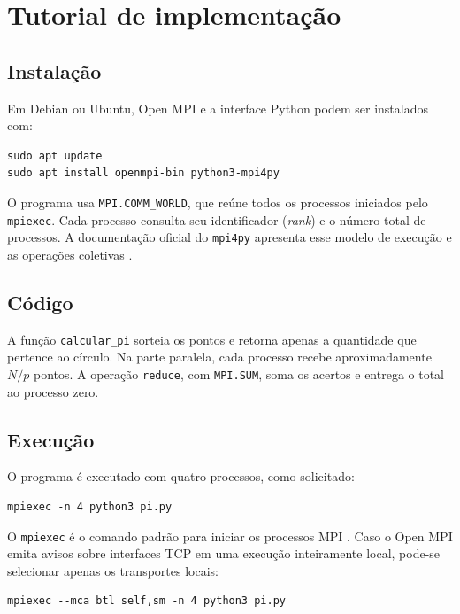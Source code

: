 \section{Tutorial de implementação}

\subsection{Instalação}

Em Debian ou Ubuntu, Open MPI e a interface Python podem ser instalados com:

\begin{lstlisting}[style=terminal]
sudo apt update
sudo apt install openmpi-bin python3-mpi4py
\end{lstlisting}

O programa usa \texttt{MPI.COMM\_WORLD}, que reúne todos os processos
iniciados pelo \texttt{mpiexec}. Cada processo consulta seu identificador
(\textit{rank}) e o número total de processos. A documentação oficial do
\texttt{mpi4py} apresenta esse modelo de execução e as operações coletivas
\cite{mpi4py}.

\subsection{Código}

A função \texttt{calcular\_pi} sorteia os pontos e retorna apenas a quantidade
que pertence ao círculo. Na parte paralela, cada processo recebe
aproximadamente $N/p$ pontos. A operação \texttt{reduce}, com
\texttt{MPI.SUM}, soma os acertos e entrega o total ao processo zero.



\subsection{Execução}

O programa é executado com quatro processos, como solicitado:

\begin{lstlisting}[style=terminal]
mpiexec -n 4 python3 pi.py
\end{lstlisting}

O \texttt{mpiexec} é o comando padrão para iniciar os processos MPI
\cite{openmpi}. Caso o Open MPI emita avisos sobre interfaces TCP em uma
execução inteiramente local, pode-se selecionar apenas os transportes locais:

\begin{lstlisting}[style=terminal]
mpiexec --mca btl self,sm -n 4 python3 pi.py
\end{lstlisting}
